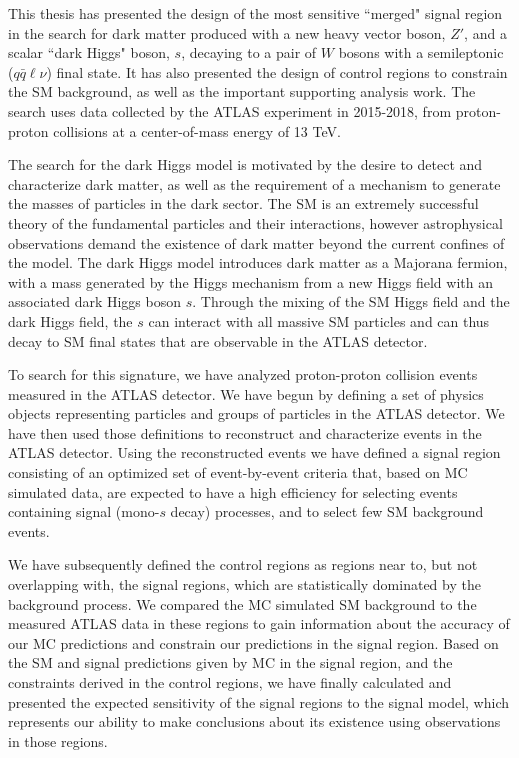 \label{concl}
This thesis has presented the design of the most sensitive ``merged" signal region in the search for dark matter produced with a new heavy vector boson, $Z'$, and a scalar ``dark Higgs" boson, $s$, decaying to a pair of $W$ bosons with a semileptonic ($q\bar{q}\ell\nu$) final state. It has also presented the design of control regions to constrain the \ttbar SM background, as well as the important supporting analysis work.  The search uses data collected by the ATLAS experiment in 2015-2018, from proton-proton collisions at a center-of-mass energy of 13 TeV.

The search for the dark Higgs model \cite{Hunting} is motivated by the desire to detect and characterize dark matter, as well as the requirement of a mechanism to generate the masses of particles in the dark sector. The SM is an extremely successful theory of the fundamental particles and their interactions, however astrophysical observations demand the existence of dark matter beyond the current confines of the model. The dark Higgs model introduces dark matter as a Majorana fermion, with a mass generated by the Higgs mechanism from a new Higgs field with an associated dark Higgs boson $s$. Through the mixing of the SM Higgs field and the dark Higgs field, the $s$ can interact with all massive SM particles and can thus decay to SM final states that are observable in the ATLAS detector.

To search for this signature, we have analyzed proton-proton collision events measured in the ATLAS detector. We have begun by defining a set of physics objects representing particles and groups of particles in the ATLAS detector. We have then used those definitions to reconstruct and characterize events in the ATLAS detector. Using the reconstructed events we have defined a signal region consisting of an optimized set of event-by-event criteria that, based on MC simulated data, are expected to have a high efficiency for selecting events containing signal (mono-$s$ decay) processes, and to select few SM background events.

We have subsequently defined the control regions as regions near to, but not overlapping with, the signal regions, which are statistically dominated by the \ttbar background process. We compared the MC simulated SM background to the measured ATLAS data in these regions to gain information about the accuracy of our MC predictions and constrain our predictions in the signal region. Based on the SM and signal predictions given by MC in the signal region, and the constraints derived in the control regions, we have finally calculated and presented the expected sensitivity of the signal regions to the signal model, which represents our ability to make conclusions about its existence using observations in those regions.

